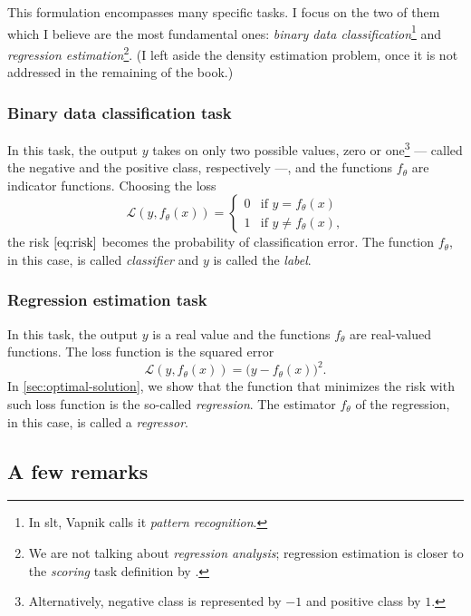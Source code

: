 This formulation encompasses many specific tasks. I focus on the two of them which I
believe are the most fundamental ones: \emph{binary data classification}\footnote{In
\gls{slt}, Vapnik calls it \emph{pattern recognition}.} and \emph{regression
estimation}\footnote{We are not talking about \emph{regression analysis}; regression
estimation is closer to the \emph{scoring} task definition by .}.  (I
left aside the density estimation problem, once it is not addressed in the remaining of
the book.)

\subsubsection{Binary data classification task}

In this task, the output $y$ takes on
only two possible values, zero or one\footnote{Alternatively, negative class is
represented by $-1$ and positive class by $1$.} --- called the negative and the positive
class, respectively ---, and the functions $f_\theta$ are indicator
functions. Choosing the loss
\begin{equation*}
  \mathcal{L}(y, f_\theta(x)) = \begin{cases}
    0 & \text{if } y = f_\theta(x) \\
    1 & \text{if } y \neq f_\theta(x)\text{,}
  \end{cases}
\end{equation*}
the risk $\eqref{eq:risk}$ becomes the probability of
classification error.  The function $f_\theta$, in this case, is called \emph{classifier}
and $y$ is called the \emph{label}.

\subsubsection{Regression estimation task}

In this task, the output $y$ is a real value and the functions $f_\theta$ are real-valued
functions.  The loss function is the squared error
\[
  \mathcal{L}(y, f_\theta(x)) = \big(y - f_\theta(x)\big)^2\text{.}
\]
In \cref{sec:optimal-solution}, we show that the function that minimizes the risk with such
loss function is the so-called \emph{regression}.
The estimator $f_\theta$ of the regression, in this case, is called a \emph{regressor}.

\subsection{A few remarks}

